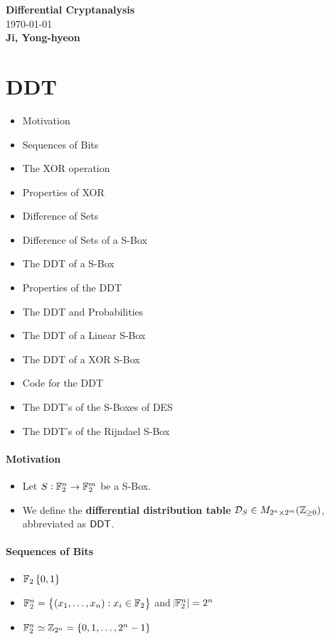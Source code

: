 \documentclass[11pt,openany]{article}
\begin{document}
\begin{center}
	\huge\textbf{Differential Cryptanalysis}\\
	\vspace{0.5em}
	\normalsize{\today}\\
	\vspace{0.5em}
	\large\textbf{Ji, Yong-hyeon}\\
	\vspace{0.5em}
\end{center}

\section{DDT}

\begin{itemize}
	\item Motivation
	\item Sequences of Bits
	\item The XOR operation
	\item Properties of XOR
	\item Difference of Sets
	\item Difference of Sets of a S-Box
	\item The DDT of a S-Box
	\item Properties of the DDT
	\item The DDT and Probabilities
	\item The DDT of a Linear S-Box
	\item The DDT of a XOR S-Box
	\item Code for the DDT
	\item The DDT's of the S-Boxes of DES
	\item The DDT's of the Rijndael S-Box
\end{itemize}
\newpage
\paragraph{Motivation}

\begin{itemize}
	\item Let $S:\mathbb{F}_2^n\to\mathbb{F}_2^m$ be a S-Box.
	\item We define the \textbf{differential distribution table} $\mathcal{D}_S\in M_{2^n\times 2^m}(\mathbb{Z}_{\geq 0})$, abbreviated as $\mathsf{DDT}$.
\end{itemize}

\paragraph{Sequences of Bits}
\begin{itemize}
	\item $\mathbb{F}_2\set{0,1}$
	\item $\mathbb{F}_2^n=\set{(x_1,\dots,x_n):x_i\in\mathbb{F}_2}$ and $\abs{\mathbb{F}_2^n}=2^n$
	\item $\mathbb{F}_2^n\simeq\mathbb{Z}_{2^n}=\set{0,1,\dots,2^n-1}$
\end{itemize}
\end{document}

